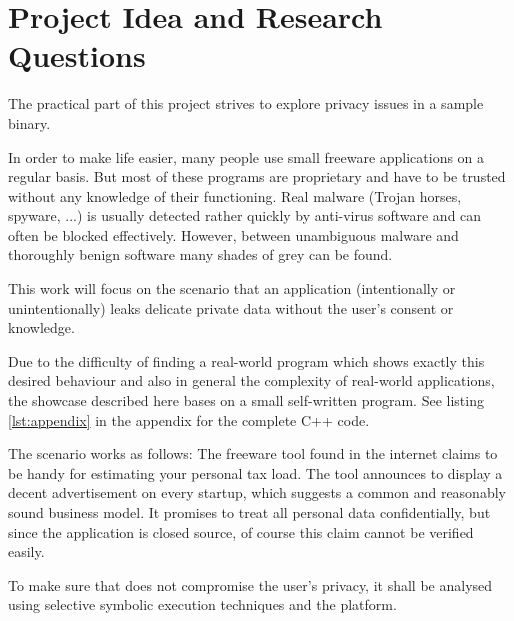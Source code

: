 \section{Project Idea and Research Questions}\label{sec:proj}

The practical part of this project strives to explore privacy issues in a sample binary.

In order to make life easier, many people use small freeware applications on a regular basis.
But most of these programs are proprietary and have to be trusted without any knowledge of their functioning.
Real malware (Trojan horses, spyware, ...) is usually detected rather quickly by anti-virus software and can often be blocked effectively.
However, between unambiguous malware and thoroughly benign software many shades of grey can be found.

This work will focus on the scenario that an application (intentionally or unintentionally) leaks delicate private data without the user's consent or knowledge.


Due to the difficulty of finding a real-world program which shows exactly this desired behaviour and also in general the complexity of real-world applications, the showcase described here bases on a small self-written program. See listing \ref{lst:appendix} in the appendix for the complete C++ code.

The scenario works as follows: The freeware tool \app found in the internet claims to be handy for estimating your personal tax load.
The tool announces to display a decent advertisement on every startup, which suggests a common and reasonably sound business model.
It promises to treat all personal data confidentially, but since the application is closed source, of course this claim cannot be verified easily.

To make sure that \app does not compromise the user's privacy, it shall be analysed using selective symbolic execution techniques and the \sse platform.

